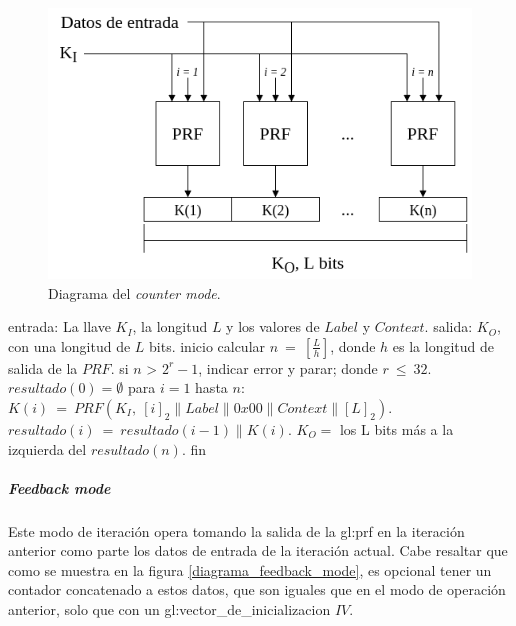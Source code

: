 \begin{figure}[H]
  \begin{center}
    \includegraphics[width=0.75\linewidth]{diagramas/counter_mode}
    \caption{Diagrama del \textit{counter mode}.}
    \label{diagrama_counter_mode}
   \end{center}
\end{figure}

\begin{pseudocodigo}[caption={Funcionamiento del \textit{counter mode}.}, 
label={mi:1}]
  entrada:   La llave $K_I$, la longitud $L$ y los valores de $Label$ y $Context$.
  salida:    $K_O$, con una longitud de $L$ bits.
  inicio
    calcular $n\: =\: [\frac{L}{h}]$, donde $h$ es la longitud de salida de la $PRF$.
    si $n$ > $2^r-1$, indicar error y parar; donde $r\: \leq\: 32$.
    $resultado(0) = \emptyset$
    para $i=1$ hasta $n$:
      $K(i)\: =\: PRF(K_I,\: {[i]}_2 \parallel Label \parallel 0x00 \parallel Context \parallel {[L]}_2 )$.
      $resultado(i)\: =\: resultado(i-1) \parallel K(i)$.
    $K_O =$ los L bits más a la izquierda del $resultado(n)$.
  fin
\end{pseudocodigo}

\subparagraph{Feedback mode}
Este modo de iteración opera tomando la salida de la \gls{gl:prf} en la
iteración anterior como parte los datos de entrada de la iteración actual.
Cabe resaltar que como se muestra en la figura \ref{diagrama_feedback_mode}, 
es opcional tener un contador concatenado a estos datos, que son iguales que 
en el modo de operación anterior, solo que con un 
\gls{gl:vector_de_inicializacion} $IV$.

